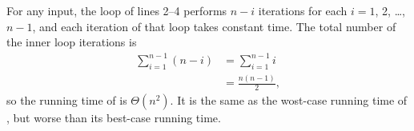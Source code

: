 For any input, the  loop of lines 2--4 performs $n-i$ iterations for each $i=1$, 2, \dots, $n-1$, and each iteration of that loop takes constant time.
The total number of the inner loop iterations is
\begin{align*}
    \sum_{i=1}^{n-1}(n-i) &= \sum_{i=1}^{n-1}i \\[1mm]
    &= \frac{n(n-1)}{2},
\end{align*}
so the running time of  is $\Theta(n^2)$.
It is the same as the wost-case running time of , but worse than its best-case running time.
